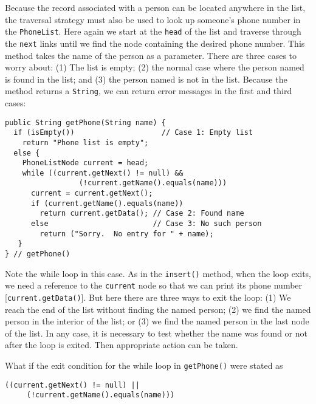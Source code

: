 \noindent Because the record associated with a person can be located
anywhere in the list, the traversal strategy must also be used to look
up someone's phone number in the {\tt PhoneList}. Here again we start
at the {\tt head} of the list and traverse through the {\tt next} links
until we find the node containing the desired phone number.  This
method takes the name of the person as a parameter.  There are three
cases to worry about: (1) The list is empty; (2) the normal case where
the person named is found in the list; and (3) the person named is not
in the list.  Because the method returns a {\tt String}, we can return
error messages in the first and third cases:

\begin{jjjlisting}
\begin{lstlisting}
public String getPhone(String name) {
  if (isEmpty())                    // Case 1: Empty list
    return "Phone list is empty";
  else {
    PhoneListNode current = head;
    while ((current.getNext() != null) &&
                 (!current.getName().equals(name)))
      current = current.getNext();
      if (current.getName().equals(name))
        return current.getData(); // Case 2: Found name
      else                        // Case 3: No such person
        return ("Sorry.  No entry for " + name);
   }
} // getPhone()
\end{lstlisting}
\end{jjjlisting}

\noindent Note the while loop in this case.   As in the {\tt insert()}
method, when the loop exits, we need a reference to the {\tt current}
node so that we can print its phone number [{\tt current.getData()}].  But
here there are three ways to exit the loop: (1) We reach the end of
the list without finding the named person; (2) we find the named
person in the interior of the list; or (3) we find the named person
in the last node of the list.  In any case, it is necessary to test
whether the name was found or not after the loop is exited.  Then
appropriate action can be taken.

\label{self-study-exercise}
\begin{SSTUDY}

\item  What if the exit condition for the while loop
in {\tt getPhone()} were stated as
\begin{jjjlisting}
\begin{lstlisting}
((current.getNext() != null) ||
     (!current.getName().equals(name)))
\end{lstlisting}
\end{jjjlisting}
\end{SSTUDY}

